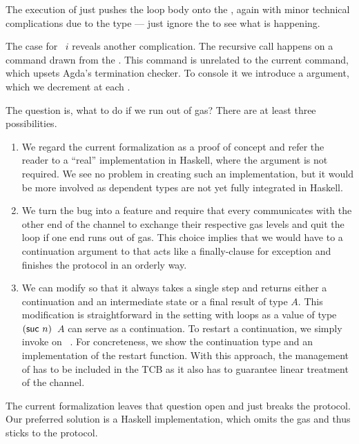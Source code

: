 \documentclass[acmsmall,screen,anonymous,review]{acmart}
\begin{document}
\rstExecutorSignature\vspace{-1.5\baselineskip}
\rstExecutor

The execution of {\AMU} just pushes the loop body onto the
{\ACommandStore}, again with minor technical complications due to the
{\AFin} type --- just ignore the  to see what is
happening.

The case for {\ACONTINUE~$i$} reveals another complication. The recursive
call happens on a command drawn from the {\ACommandStore}. This
command is unrelated to the current command, which upsets Agda's
termination checker. To console it we introduce a 
argument, which we decrement at each {\ACONTINUE}.

The question is, what to do if we run out of gas?
There are at least three possibilities.
\begin{enumerate}
\item We regard the current formalization as a proof of concept and
  refer the reader to a ``real'' implementation in Haskell, where the
   argument is not required. We see no
  problem in creating such an implementation, but it would be more
  involved as dependent types are not yet fully integrated in Haskell.
\item We turn the bug into a feature and require that every
  {\ACONTINUE} communicates with the other end of the channel to
  exchange their respective gas levels and quit the loop if one end
  runs out of gas. This choice implies that we would have to a
  continuation argument to  {\ACONTINUE} that acts like a
  finally-clause for exception and finishes the protocol in an orderly
  way.
\item We can modify {\Aexecutor} so that it always takes a single step
  and returns either a continuation and an intermediate state or a
  final result of type $A$. This modification is straightforward in 
  the setting with loops as a value  of type {\ACommandStore~$(\Asuc~n)$~$A$}
  can serve as a continuation. To restart a continuation, we simply invoke
  {\Aexecutor} on ~\Azero. For concreteness, we show
  the continuation type and an implementation of the restart function.
  \rstAlternativeExecutorRestart
  With this approach, the management of {\Arestart}  has to be
  included in the TCB as it also has to guarantee linear treatment of
  the channel.
\end{enumerate}
The current formalization leaves that question open and just breaks
the protocol. Our preferred solution is a Haskell implementation,
which omits the gas and thus sticks to the protocol.
\end{document}

